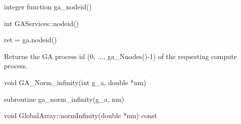 \documentclass[12pt]{article}
\begin{document}
\begin{fapi}
\begin{fcode}
integer function ga_nodeid()
\end{fcode}
\end{fapi}

\begin{cxxapi}
\begin{cxxcode}
int GAServices::nodeid()
\end{cxxcode}
\end{cxxapi}

\begin{pyapi}
\begin{pycode}
ret = ga.nodeid()
\end{pycode}
\end{pyapi}

\local

\begin{desc}

Returns the GA process id (0, ..., ga_Nnodes()-1) of the requesting compute
process.

\end{desc}


\begin{capi}
\begin{ccode}
void GA_Norm_infinity(int g_a, double *nm)
\end{ccode}
\begin{funcargs}
\end{funcargs}
\end{capi}

\begin{fapi}
\begin{fcode}
subroutine ga_norm_infinity(g_a, nm)
\end{fcode}
\begin{funcargs}
\end{funcargs}
\end{fapi}

\begin{cxxapi}
\begin{cxxcode}
void GlobalArray::normInfinity(double *nm) const
\end{cxxcode}
\begin{funcargs}
\end{funcargs}
\end{cxxapi}
\end{document}
